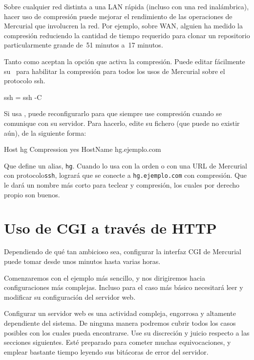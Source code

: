Sobre cualquier red distinta a una LAN rápida (incluso con una red
inalámbrica), hacer uso de compresión puede mejorar el rendimiento
de las operaciones de Mercurial que involucren la red.  Por ejemplo,
sobre WAN, alguien ha medido la compresión reduciendo la cantidad
de tiempo requerido para clonar un repositorio particularmente
grande de~51 minutos a~17 minutos.

Tanto  como  aceptan la opción
 que activa la compresión.  Puede editar fácilmente
su \hgrc\ para habilitar la compresión para todos los usos de
Mercurial sobre el protocolo ssh.
\begin{codesample2}
  [ui]
  ssh = ssh -C
\end{codesample2}

Si usa , puede reconfigurarlo para que siempre use
compresión cuando se comunique con su servidor.  Para hacerlo,
edite su fichero  (que puede no existir
aún), de la siguiente forma:
\begin{codesample2}
  Host hg
    Compression yes
    HostName hg.ejemplo.com
\end{codesample2}
Que define un alias, \texttt{hg}.  Cuando lo usa con la orden
 o con una URL de Mercurial con protocolo\texttt{ssh},
logrará que  se conecte a \texttt{hg.ejemplo.com}
con compresión.  Que le dará un nombre más corto para teclear y
compresión, los cuales por derecho propio son buenos.

\section{Uso de CGI a través de HTTP}
\label{sec:collab:cgi}

Dependiendo de qué tan ambicioso sea, configurar la interfaz CGI
de Mercurial puede tomar desde unos minutos hasta varias horas.

Comenzaremos con el ejemplo más sencillo, y nos dirigiremos hacia
configuraciones más complejas.  Incluso para el caso más básico
necesitará leer y modificar su configuración del servidor web.

\begin{note}
  Configurar un servidor web es una actividad compleja, engorrosa y
  altamente dependiente del sistema.  De ninguna manera podremos
  cubrir todos los casos posibles con los cuales pueda encontrarse.
  Use su discreción y juicio respecto a las secciones siguientes.
  Esté preparado para cometer muchas equivocaciones, y emplear
  bastante tiempo leyendo sus bitácoras de error del servidor.
\end{note}

